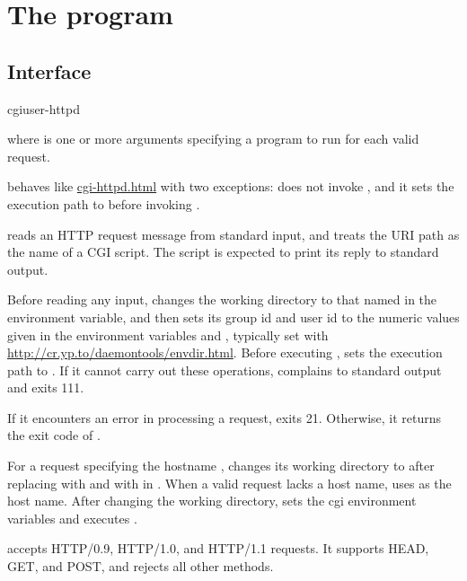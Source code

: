 
\chapter{The  program}

\section{Interface}
\begin{code}
  cgiuser-httpd 
\end{code}
where  is one or more arguments specifying a program to run
for each valid request.

 behaves like \href{\cmd{cgi-httpd}}{cgi-httpd.html} with two
exceptions:  does not invoke , and it sets the
execution path to  before invoking .

 reads an HTTP request message from standard input,
and treats the URI path as the name of a CGI script.  The script is
expected to print its reply to standard output.

Before reading any input,  changes the working directory to
that named in the  environment variable, and then sets its group id
and user id to the numeric values given in the environment variables 
and , typically set with
\href{\cmd{envdir}}{http://cr.yp.to/daemontools/envdir.html}.  Before executing
,  sets the execution path to .
If it cannot carry out these operations,  complains to
standard output and exits 111.

If it encounters an error in processing a request, 
exits 21.  Otherwise, it returns the exit code of .

For a request specifying the hostname , 
changes its working directory to  after replacing
  with \cmd{/:} and \cmd{//} with \cmd{/} in
.  When a valid request lacks a host name,
 uses  as the host name.  After changing the
working directory,  sets the cgi environment variables
and executes .

 accepts HTTP/0.9, HTTP/1.0, and HTTP/1.1 requests.  It
supports HEAD, GET, and POST, and rejects all other methods.

